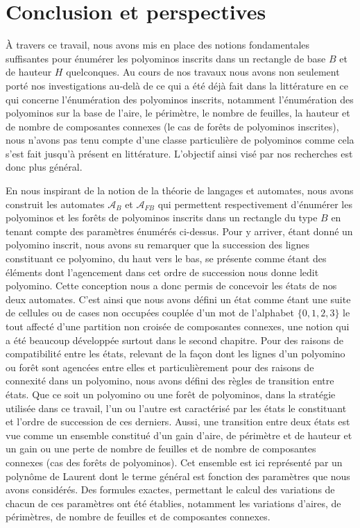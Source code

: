 \chapter*{Conclusion et perspectives}
À travers ce travail, nous avons mis en place des notions fondamentales  suffisantes pour énumérer les polyominos inscrits dans un rectangle  de base $B$ et de hauteur $H$ quelconques.  Au cours de nos travaux nous avons non seulement porté nos investigations au-delà de ce qui a été déjà fait dans la littérature en ce qui concerne l’énumération des polyominos inscrits, notamment l’énumération des polyominos sur la base de l’aire, le périmètre, le nombre de feuilles, la hauteur et de nombre de composantes connexes (le cas de forêts de polyominos inscrites), nous n’avons pas tenu compte d’une classe particulière de polyominos comme cela s’est fait jusqu’à présent en littérature. L’objectif ainsi visé par nos recherches est donc plus général.


En nous inspirant de la notion de la théorie de langages et automates, nous avons construit les   automates $\mathcal{A}_{B}$ et $\mathcal{A}_{FB}$ qui permettent respectivement d’énumérer les polyominos et les forêts de polyominos inscrits dans un rectangle du type $B$ en tenant compte des paramètres énumérés ci-dessus. Pour y arriver, étant donné un polyomino inscrit, nous avons su remarquer que la succession des lignes constituant ce polyomino, du haut vers le bas, se présente comme étant des éléments  dont l’agencement dans cet ordre de succession nous donne ledit polyomino. Cette conception nous a donc permis de concevoir les états de nos deux automates. C’est ainsi que nous avons défini un état comme étant une suite de cellules  ou de cases non occupées couplée d’un mot de l’alphabet $\{0,1,2,3\}$ le tout affecté d’une partition non croisée de composantes connexes, une notion qui a été beaucoup développée surtout dans le second chapitre.
   Pour des raisons de compatibilité entre les états, relevant de la façon dont les lignes d'un polyomino ou forêt sont agencées entre elles  et particulièrement  pour des raisons de connexité dans un polyomino, nous avons défini des règles de transition entre états.  Que  ce soit un polyomino ou une forêt de polyominos, dans la stratégie utilisée dans ce travail, l’un ou l’autre est caractérisé par les états le constituant et l’ordre de succession de ces derniers. Aussi, une transition entre deux états est vue comme un ensemble constitué d’un gain d’aire, de périmètre et de hauteur et un gain ou une perte de nombre de feuilles et de nombre de composantes connexes (cas des forêts de polyominos). Cet ensemble est ici représenté par un polynôme  de Laurent dont le terme général est fonction des paramètres que nous avons considérés. Des formules exactes, permettant le calcul des variations de chacun de ces paramètres ont été établies, notamment les variations d’aires, de périmètres, de nombre de feuilles et de composantes connexes.
   
